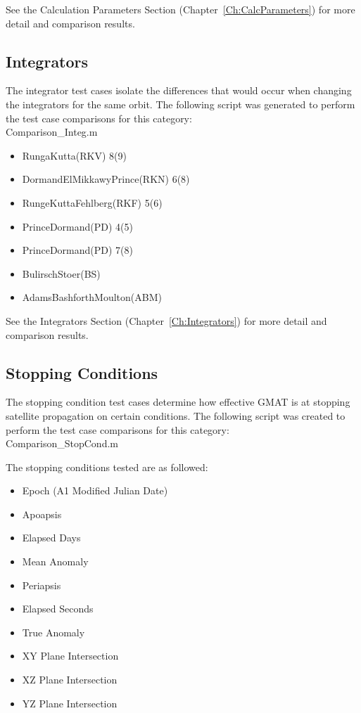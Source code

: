 See the Calculation Parameters Section
(Chapter~\ref{Ch:CalcParameters}) for more detail and comparison
results.

\subsection{Integrators}
The integrator test cases isolate the differences that would occur
when changing the integrators for the same orbit. The following
script was generated to perform the test case comparisons for this category:\\
Comparison\_Integ.m

\begin{itemize}
    \item RungaKutta(RKV) 8(9)
    \item DormandElMikkawyPrince(RKN) 6(8)
    \item RungeKuttaFehlberg(RKF) 5(6)
    \item PrinceDormand(PD) 4(5)
    \item PrinceDormand(PD) 7(8)
    \item BulirschStoer(BS)
    \item AdamsBashforthMoulton(ABM)
\end{itemize}

See the Integrators Section
(Chapter~\ref{Ch:Integrators}) for more detail and comparison
results.

\subsection{Stopping Conditions}
The stopping condition test cases determine how effective GMAT is at
stopping satellite propagation on certain conditions. The following
script was created to
perform the test case comparisons for this category: \\
Comparison\_StopCond.m

The stopping conditions tested are as followed:
\begin{itemize}
    \item Epoch (A1 Modified Julian Date)
    \item Apoapsis
    \item Elapsed Days
    \item Mean Anomaly
    \item Periapsis
    \item Elapsed Seconds
    \item True Anomaly
    \item XY Plane Intersection
    \item XZ Plane Intersection
    \item YZ Plane Intersection
\end{itemize}

